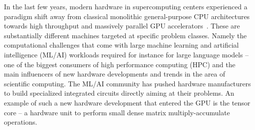%
% 
%
%
%


In the last few years, modern hardware in supercomputing centers experienced a paradigm shift away from classical monolithic general-purpose CPU architectures towards high throughput and massively parallel GPU accelerators~\cite{online:top500,khan2021analysis,Satoshi:2009,Navarro:2014}.
These are substantially different machines targeted at specific problem classes.
Namely the computational challenges that come with large machine learning and artificial intelligence (ML/AI) workloads required for instance for large language models -- one of the biggest consumers of high performance computing (HPC) and the main influencers of new hardware developments and trends in the area of scientific computing.
The ML/AI community has pushed hardware manufacturers to build specialized integrated circuits directly aiming at their problems.
An example of such a new hardware development that entered the GPU is the tensor core \cite{markidis2018nvidia,10.1007/978-3-030-10549-5_35} -- a hardware unit to perform small dense matrix multiply-accumulate operations.

